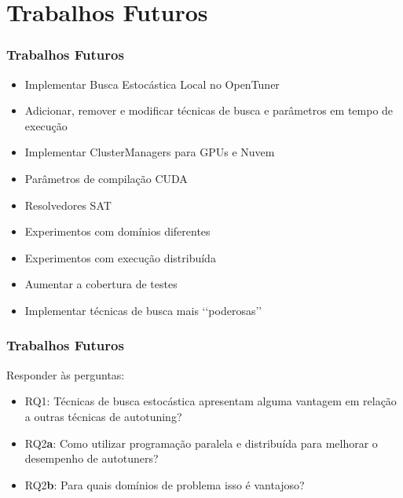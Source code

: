 \documentclass[10pt, compress]{beamer}
\begin{document}
\section{Trabalhos Futuros}

\begin{frame}[fragile]
    \frametitle{Trabalhos Futuros}
    \begin{itemize}
        \item Implementar Busca Estocástica Local no \alert{OpenTuner}
            \pause
        \item \alert{Adicionar}, \alert{remover} e \alert{modificar} técnicas
            de busca e parâmetros em \alert{tempo de execução}
            \pause
        \item Implementar \alert{ClusterManagers} para \alert{GPUs} e \alert{Nuvem}
            \pause
        \item Parâmetros de compilação \alert{CUDA}
        \item Resolvedores \alert{SAT}
            \pause
        \item Experimentos com \alert{domínios diferentes}
        \item Experimentos com \alert{execução distribuída}
            \pause
        \item \alert{Aumentar} a cobertura de testes
            \pause
        \item Implementar técnicas de busca mais \lq{}\lq{}\alert{poderosas}\rq{}\rq{}
    \end{itemize}
\end{frame}

\begin{frame}[fragile]
    \frametitle{Trabalhos Futuros}
    Responder às perguntas:
    \begin{itemize}
        \item \alert{RQ1}: Técnicas de busca estocástica apresentam
            alguma vantagem em relação a outras técnicas de autotuning?
            \pause
        \item \alert{RQ2\textbf{a}}: Como utilizar programação paralela e
            distribuída para melhorar o desempenho de autotuners?
            \pause
        \item \alert{RQ2\textbf{b}}: Para quais domínios de problema isso é
            vantajoso?
    \end{itemize}
\end{frame}


\maketitle
\end{document}
